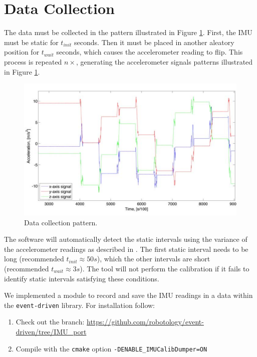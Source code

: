 \section{Data Collection} \label{sec: data collection}

The data must be collected in the pattern illustrated in Figure \ref{fig:datacollection}. 
%
First, the IMU must be static for $t_{init}$ seconds.
%
Then it must be placed in another aleatory position for $t_{wait}$ seconds, which causes the accelerometer reading to flip.
%
This process is repeated $n\times$, generating the accelerometer signals patterns illustrated in Figure \ref{fig:datacollection}.

\begin{figure}[h]
	\centering
	\includegraphics[width=0.7\linewidth]{figures/data_collection}
	\caption{Data collection pattern.}
	\label{fig:datacollection}
\end{figure}

\begin{important}
	The software will automatically detect the static intervals using the variance of the accelerometer readings as described in \cite{2014:Tedaldi}. The first static interval needs to be long (recommended $t_{init} \approx 50s$), which the other intervals are short (recommended $t_{wait}\approx 3s$). The tool will not perform the calibration if it fails to identify static intervals satisfying these conditions.
\end{important}

We implemented a module to record and save the IMU readings in a data within the \texttt{event-driven} library.
%
For installation follow:

\begin{enumerate}
	\item Check out the branch: \url{https://github.com/robotology/event-driven/tree/IMU_port}
	\item Compile with the \texttt{cmake} option \texttt{-DENABLE\_IMUCalibDumper=ON}
\end{enumerate}

